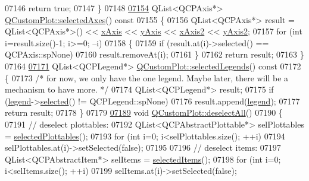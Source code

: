 \begin{DoxyCode}
07146   \textcolor{keywordflow}{return} \textcolor{keyword}{true};
07147 \}
07148 
\hypertarget{a00115_source_l07154}{}\hyperlink{a00116_aa6baf867e8beb96ed5bd471f83ece903}{07154} QList<QCPAxis*> \hyperlink{a00116_aa6baf867e8beb96ed5bd471f83ece903}{QCustomPlot::selectedAxes}()\textcolor{keyword}{ const}
07155 \textcolor{keyword}{}\{
07156   QList<QCPAxis*> result = QList<QCPAxis*>() << \hyperlink{a00116_a384438707adbcc96b0fa1324106f7129}{xAxis} << \hyperlink{a00116_af168096ce67002b1fbce18ae5dd1b652}{yAxis} << 
      \hyperlink{a00116_a058f6d3a4c86bf94c476e5c380711dba}{xAxis2} << \hyperlink{a00116_a4fd6679232da7da0a1ae4e1b6ae83d6e}{yAxis2};
07157   \textcolor{keywordflow}{for} (\textcolor{keywordtype}{int} i=result.size()-1; i>=0; --i)
07158   \{
07159     \textcolor{keywordflow}{if} (result.at(i)->selected() == QCPAxis::spNone)
07160       result.removeAt(i);
07161   \}
07162   \textcolor{keywordflow}{return} result;
07163 \}
07164 
\hypertarget{a00115_source_l07171}{}\hyperlink{a00116_a1ea6297300c3e2770e65f95836411755}{07171} QList<QCPLegend*> \hyperlink{a00116_a1ea6297300c3e2770e65f95836411755}{QCustomPlot::selectedLegends}()\textcolor{keyword}{ const}
07172 \textcolor{keyword}{}\{
07173   \textcolor{comment}{/* for now, we only have the one legend. Maybe later, there will be a mechanism to have more. */}
07174   QList<QCPLegend*> result;
07175   \textcolor{keywordflow}{if} (\hyperlink{a00116_a75acd427ec48e9a9d2ae6a17817cc490}{legend}->\hyperlink{a00045_a10948e896935ad14f374e6f712afaae9}{selected}() != QCPLegend::spNone)
07176     result.append(\hyperlink{a00116_a75acd427ec48e9a9d2ae6a17817cc490}{legend});
07177   \textcolor{keywordflow}{return} result;
07178 \}
07179 
\hypertarget{a00115_source_l07189}{}\hyperlink{a00116_a9d4808ab925b003054085246c92a257c}{07189} \textcolor{keywordtype}{void} \hyperlink{a00116_a9d4808ab925b003054085246c92a257c}{QCustomPlot::deselectAll}()
07190 \{
07191   \textcolor{comment}{// deselect plottables:}
07192   QList<QCPAbstractPlottable*> selPlottables = \hyperlink{a00116_a6721b8c689bb7f2f400987e580508fe8}{selectedPlottables}();
07193   \textcolor{keywordflow}{for} (\textcolor{keywordtype}{int} i=0; i<selPlottables.size(); ++i)
07194     selPlottables.at(i)->setSelected(\textcolor{keyword}{false});
07195   
07196   \textcolor{comment}{// deselect items:}
07197   QList<QCPAbstractItem*> selItems = \hyperlink{a00116_a3714adb0a26b8cf1bd70740a7ea464c4}{selectedItems}();
07198   \textcolor{keywordflow}{for} (\textcolor{keywordtype}{int} i=0; i<selItems.size(); ++i)
07199     selItems.at(i)->setSelected(\textcolor{keyword}{false});

\end{DoxyCode}
